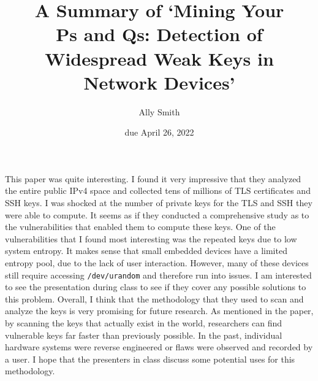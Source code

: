 \documentclass[12pt]{article}
\title{\bf A Summary of `Mining Your \\Ps and Qs: Detection of
Widespread Weak Keys in Network Devices'}
\author{Ally Smith}
\date{due April 26, 2022}
\begin{document}
\maketitle{}

This paper was quite interesting. I found it very impressive that they analyzed
the entire public IPv4 space and collected tens of millions of TLS certificates
and SSH keys. I was shocked at the number of private keys for the TLS and SSH
they were able to compute. It seems as if they conducted a comprehensive study
as to the vulnerabilities that enabled them to compute these keys. One of the
vulnerabilities that I found most interesting was the repeated keys due to low
system entropy. It makes sense that small embedded devices have a limited
entropy pool, due to the lack of user interaction. However, many of these
devices still require accessing \texttt{/dev/urandom} and therefore run into
issues. I am interested to see the presentation during class to see if they
cover any possible solutions to this problem. Overall, I think that the
methodology that they used to scan and analyze the keys is very promising for
future research. As mentioned in the paper, by scanning the keys that actually
exist in the world, researchers can find vulnerable keys far faster than
previously possible. In the past, individual hardware systems were reverse
engineered or flaws were observed and recorded by a user. I hope that the
presenters in class discuss some potential uses for this methodology.
\end{document}
